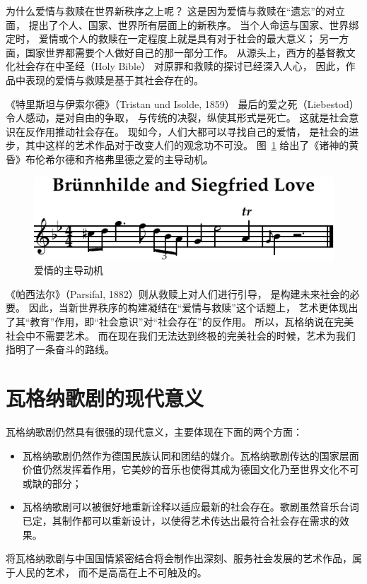 \documentclass[10pt,a4paper,twocolumn]{article}
\begin{document}
      为什么爱情与救赎在世界新秩序之上呢？
      这是因为爱情与救赎在``遗忘''的对立面，
      提出了个人、国家、世界所有层面上的新秩序。
      当个人命运与国家、世界绑定时，
      爱情或个人的救赎在一定程度上就是具有对于社会的最大意义；
      另一方面，国家世界都需要个人做好自己的那一部分工作。
      从源头上，西方的基督教文化社会存在中圣经（Holy Bible）
      对原罪和救赎的探讨已经深入人心，
      因此，作品中表现的爱情与救赎是基于其社会存在的。

      《特里斯坦与伊索尔德》（Tristan und Isolde, 1859）
      最后的爱之死（Liebestod）令人感动，是对自由的争取，
      与传统的决裂，纵使其形式是死亡。
      这就是社会意识在反作用推动社会存在。
      现如今，人们大都可以寻找自己的爱情，
      是社会的进步，其中这样的艺术作品对于改变人们的观念功不可没。
      图~\ref{fig:love} 给出了《诸神的黄昏》布伦希尔德和齐格弗里德之爱的主导动机。
      \begin{figure}[htbp]
        \centering
        \includegraphics[width=\linewidth]{music/love-crop.pdf}
        \caption{爱情的主导动机\cite{wagner1876gotterdammerung}}
        \label{fig:love}
      \end{figure}

      《帕西法尔》（Parsifal, 1882）则从救赎上对人们进行引导，
      是构建未来社会的必要。
      因此，当新世界秩序的构建凝结在``爱情与救赎''这个话题上，
      艺术更体现出了其``教育''作用，即``社会意识''对``社会存在''的反作用。
      所以，瓦格纳说在完美社会中不需要艺术。
      而在现在我们无法达到终极的完美社会的时候，艺术为我们指明了一条奋斗的路线。

  \section{瓦格纳歌剧的现代意义}

    瓦格纳歌剧仍然具有很强的现代意义，主要体现在下面的两个方面：
    \begin{itemize}
      \item 瓦格纳歌剧仍然作为德国民族认同和团结的媒介。瓦格纳歌剧传达的国家层面价值仍然发挥着作用，它美妙的音乐也使得其成为德国文化乃至世界文化不可或缺的部分；
      \item 瓦格纳歌剧可以被很好地重新诠释以适应最新的社会存在。歌剧虽然音乐台词已定，其制作都可以重新设计，以使得艺术传达出最符合社会存在需求的效果。
    \end{itemize}
    将瓦格纳歌剧与中国国情紧密结合将会制作出深刻、服务社会发展的艺术作品，属于人民的艺术，
    而不是高高在上不可触及的。
\end{document}
